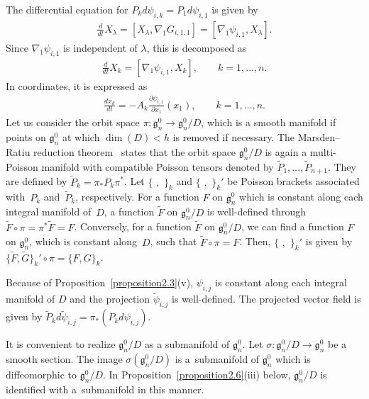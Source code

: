 \documentclass[pdftex]{sigma}
\numberwithin{equation}{section}
\begin{document}
The dif\/ferential equation for $P_kd\psi_{i,k} = P_1d\psi_{i,1}$ is given by
\begin{gather*}
\frac{d}{dt}X_\lambda = [X_\lambda , \nabla _1G_{i,1,1}] = [\nabla _1 \psi_{i,1}, X_\lambda ].
\end{gather*}
Since $\nabla _1 \psi_{i,1}$ is independent of $\lambda $, this is decomposed as
\begin{gather*}
\frac{d}{dt}X_k = [\nabla _1\psi_{i,1}, X_k], \qquad k=1,\dots ,n.
\end{gather*}
In coordinates, it is expressed as
\begin{gather}
\frac{dx_k}{dt} = -A_k \frac{\partial \psi_{i,1}}{\partial x_1}(x_1), \qquad k=1,\dots ,n.\label{D}
\end{gather}
Let us consider the orbit space $\pi \colon \mathfrak{g}^0_n \to \mathfrak{g}^0_n/D$, which is a smooth manifold if points on $\mathfrak{g}^0_n$ at which $\dim (D) < h$ is removed if necessary. The Marsden--Ratiu reduction theorem~\cite{Mag1} states that the orbit space $\mathfrak{g}^0_n/D$ is again a multi-Poisson manifold with compatible Poisson tensors denoted by $\widetilde{P}_1, \dots ,\widetilde{P}_{n+1}$. They are def\/ined by $\widetilde{P}_k = \pi_* P_k\pi^*$. Let $\{ \,\, , \,\, \}_k$ and $\{ \,\, ,\,\,\}_k'$ be Poisson brackets associated with~$P_k$ and~$\widetilde{P}_k$, respectively. For a function $F$ on $\mathfrak{g}^0_n$ which is constant along each integral manifold of~$D$, a function $\widetilde{F}$ on $\mathfrak{g}^0_n/D$ is well-def\/ined through $\widetilde{F} \circ \pi = \pi^* \widetilde{F} = F$. Conversely, for a function $\widetilde{F}$ on $\mathfrak{g}^0_n/D$, we can f\/ind a function $F$ on $\mathfrak{g}^0_n$, which is constant along~$D$, such that $\widetilde{F}\circ \pi = F$. Then, $\{ \,\, ,\,\,\}_k'$ is given by $\{ \widetilde{F}, \widetilde{G}\}_k' \circ \pi = \{ F, G\}_k$.

Because of Proposition~\ref{proposition2.3}(v), $\psi_{i,j}$ is constant along each integral manifold of $D$ and the projection $\widetilde{\psi}_{i,j}$ is well-def\/ined. The projected vector f\/ield is given by $\widetilde{P}_kd\widetilde{\psi}_{i,j} = \pi_* (P_kd\psi_{i,j})$.

It is convenient to realize $\mathfrak{g}^0_n/D$ as a submanifold of $\mathfrak{g}^0_n$. Let $\sigma \colon \mathfrak{g}^0_n/D \to \mathfrak{g}^0_n$ be a smooth section. The image $\sigma (\mathfrak{g}^0_n/D)$ is a~submanifold of $\mathfrak{g}^0_n$ which is dif\/feomorphic to $\mathfrak{g}^0_n/D$.
In Proposition~\ref{proposition2.6}(iii) below, $\mathfrak{g}^0_n/D$ is identif\/ied with a~submanifold in this manner.
\end{document}
